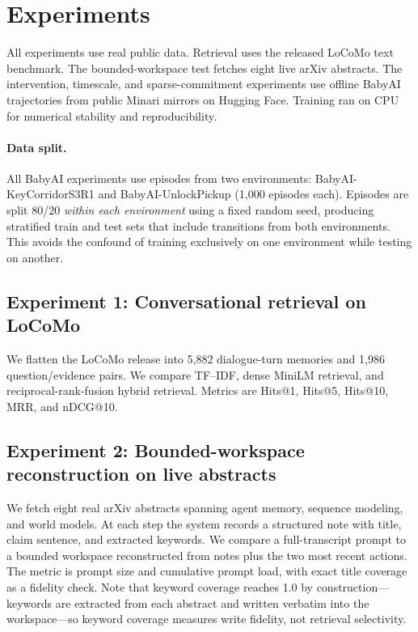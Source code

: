 \documentclass[11pt]{article}
\begin{document}
\section{Experiments}
All experiments use real public data. Retrieval uses the released LoCoMo text benchmark. The bounded-workspace test fetches eight live arXiv abstracts. The intervention, timescale, and sparse-commitment experiments use offline BabyAI trajectories from public Minari mirrors on Hugging Face. Training ran on CPU for numerical stability and reproducibility.

\paragraph{Data split.}
All BabyAI experiments use episodes from two environments: BabyAI-KeyCorridorS3R1 and BabyAI-UnlockPickup (1,000 episodes each). Episodes are split 80/20 \emph{within each environment} using a fixed random seed, producing stratified train and test sets that include transitions from both environments. This avoids the confound of training exclusively on one environment while testing on another.

\subsection{Experiment 1: Conversational retrieval on LoCoMo}
We flatten the LoCoMo release into 5,882 dialogue-turn memories and 1,986 question/evidence pairs. We compare TF--IDF, dense MiniLM retrieval, and reciprocal-rank-fusion hybrid retrieval. Metrics are Hits@1, Hits@5, Hits@10, MRR, and nDCG@10.

\subsection{Experiment 2: Bounded-workspace reconstruction on live abstracts}
We fetch eight real arXiv abstracts spanning agent memory, sequence modeling, and world models. At each step the system records a structured note with title, claim sentence, and extracted keywords. We compare a full-transcript prompt to a bounded workspace reconstructed from notes plus the two most recent actions. The metric is prompt size and cumulative prompt load, with exact title coverage as a fidelity check. Note that keyword coverage reaches 1.0 by construction---keywords are extracted from each abstract and written verbatim into the workspace---so keyword coverage measures write fidelity, not retrieval selectivity.
\end{document}
